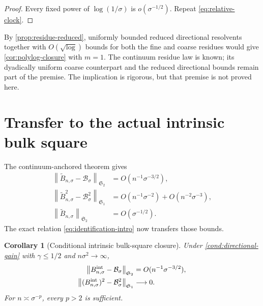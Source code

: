\documentclass[11pt]{article}
\newtheorem{corollary}[theorem]{Corollary}
\theoremstyle{definition}
\theoremstyle{remark}
\newcommand{\cB}{\mathcal B}
\newcommand{\HS}{\mathfrak S_2}
\newcommand{\TC}{\mathfrak S_1}
\newcommand{\norm}[1]{\left\lVert #1\right\rVert}
\begin{document}
\begin{proof}
Every fixed power of $\log(1/\sigma)$ is
$o(\sigma^{-1/2})$.  Repeat \eqref{eq:relative-clock}.
\end{proof}

By \cref{prop:residue-reduced}, uniformly bounded reduced directional
resolvents together with $O(\sqrt{\log})$ bounds for both the fine and
coarse residues would give \cref{cor:polylog-closure} with $m=1$.  The
continuum residue law is known; its dyadically uniform coarse counterpart
and the reduced directional bounds remain part of the premise.  The
implication is rigorous, but that premise is not proved here.

\section{Transfer to the actual intrinsic bulk square}
\label{sec:bulk-transfer}

The continuum-anchored theorem gives
\begin{align}
 \norm{\widetilde B_{n,\sigma}-\cB_\sigma}_{\HS}
 &=O(n^{-1}\sigma^{-3/2}),
 \label{eq:anchored-hs-recall}\\
 \norm{\widetilde B_{n,\sigma}^2-\cB_\sigma^2}_{\TC}
 &=O(n^{-1}\sigma^{-2})+O(n^{-2}\sigma^{-3}),
 \label{eq:anchored-trace-recall}\\
 \norm{\widetilde B_{n,\sigma}}_{\HS}
 &=O(\sigma^{-1/2}).
 \label{eq:anchored-size-recall}
\end{align}
The exact relation \eqref{eq:identification-intro} now transfers those
bounds.

\begin{corollary}[Conditional intrinsic bulk-square closure]
\label{cor:intrinsic-bulk-square}
Under \cref{cond:directional-gain} with $\gamma\le1/2$ and
$n\sigma^2\to\infty$,
\begin{align}
 \norm{B_{n,\sigma}^{\rm int}-\cB_\sigma}_{\HS}
 &=O(n^{-1}\sigma^{-3/2}),
 \label{eq:intrinsic-hs-final}\\
 \norm{(B_{n,\sigma}^{\rm int})^2-\cB_\sigma^2}_{\TC}
 &\longrightarrow0.
 \label{eq:intrinsic-trace-final}
\end{align}
For $n\asymp\sigma^{-p}$, every $p>2$ is sufficient.
\end{corollary}
\end{document}
